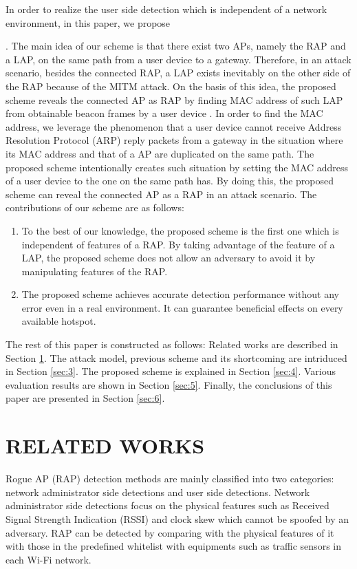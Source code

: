 \documentclass[conference]{IEEEtran}
\begin{document}
In order to realize the user side detection which is independent of a network environment, in this paper, we propose \title{} .
The main idea of our scheme is that there exist two APs, namely the RAP and a LAP, on the same path from a user device to a gateway.
Therefore, in an attack scenario, besides the connected RAP, a LAP exists inevitably on the other side of the RAP because of the MITM attack.
On the basis of this idea, the proposed scheme reveals the connected AP as RAP by finding MAC address of such LAP from obtainable beacon frames by a user device \cite{beacon}.
In order to find the MAC address, we leverage the phenomenon that a user device cannot receive Address Resolution Protocol (ARP) reply packets from a gateway in the situation where its MAC address and that of a AP are duplicated on the same path.
The proposed scheme intentionally creates such situation by setting the MAC address of a user device to the one on the same path has.
By doing this, the proposed scheme can reveal the connected AP as a RAP in an attack scenario.
The contributions of our scheme are as follows:
\begin{enumerate}
    \renewcommand{\labelenumi}{\arabic{enumi}).}
    \item To the best of our knowledge, the proposed scheme is the first one which is independent of features of a RAP. By taking advantage of the feature of a LAP, the proposed scheme does not allow an adversary to avoid it by manipulating features of the RAP.
    \item The proposed scheme achieves accurate detection performance without any error even in a real environment. It can guarantee beneficial effects on every available hotspot.
\end{enumerate}
The rest of this paper is constructed as follows: Related works are described in Section \ref{sec:2}.
The attack model, previous scheme and its shortcoming are intriduced in Section \ref{sec:3}.
The proposed scheme is explained in Section \ref{sec:4}.
Various evaluation results are shown in Section \ref{sec:5}.
Finally, the conclusions of this paper are presented in Section \ref{sec:6}.

\section{RELATED WORKS}\label{sec:2}
Rogue AP (RAP) detection methods are mainly classified into two categories: network administrator side detections and user side detections.
Network administrator side detections focus on the physical features such as Received Signal Strength Indication (RSSI) and clock skew which cannot be spoofed by an adversary.
RAP can be detected by comparing with the physical features of it with those in the predefined whitelist with equipments such as traffic sensors in each Wi-Fi network.
\end{document}

